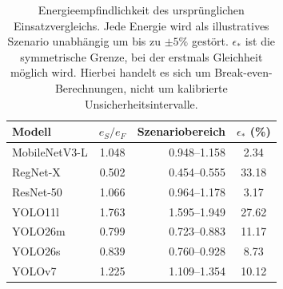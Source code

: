 \begin{table}[!htb]
\centering\small\setlength{\tabcolsep}{3pt}
\caption{Energieempfindlichkeit des ursprünglichen Einsatzvergleichs. Jede Energie wird als illustratives Szenario unabhängig um bis zu $\pm5\%$ gestört. $\epsilon_*$ ist die symmetrische Grenze, bei der erstmals Gleichheit möglich wird. Hierbei handelt es sich um Break-even-Berechnungen, nicht um kalibrierte Unsicherheitsintervalle.}
\label{tab:review:sensitivity}
\begin{tabular*}{\linewidth}{@{\extracolsep{\fill}}l S[table-format=1.3] r S[table-format=2.2]@{}}
\toprule
Modell & {$e_S/e_F$} & {Szenariobereich} & {$\epsilon_*$ (\%)} \\
\midrule
MobileNetV3-L & 1.048 & 0.948--1.158 & 2.34 \\
RegNet-X & 0.502 & 0.454--0.555 & 33.18 \\
ResNet-50 & 1.066 & 0.964--1.178 & 3.17 \\
YOLO11l & 1.763 & 1.595--1.949 & 27.62 \\
YOLO26m & 0.799 & 0.723--0.883 & 11.17 \\
YOLO26s & 0.839 & 0.760--0.928 & 8.73 \\
YOLOv7 & 1.225 & 1.109--1.354 & 10.12 \\
\bottomrule\end{tabular*}\end{table}
